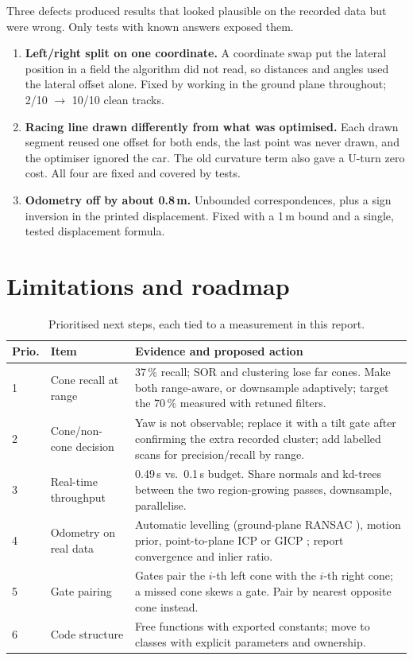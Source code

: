\documentclass[10pt,a4paper]{scrartcl}
\newcommand{\RuleSection}[1]{%
    \section{#1}%
    \vspace{0.2em}{\color{accent!35}\hrule height 0.4pt}\vspace{0.3em}%
  }
\begin{document}
  Three defects produced results that looked plausible on the recorded data but were wrong.
  Only tests with known answers exposed them.
  \begin{enumerate}
    \item \textbf{Left/right split on one coordinate.} A coordinate swap put the lateral position
      in a field the algorithm did not read, so distances and angles used the lateral offset
      alone. Fixed by working in the ground plane throughout; 2/10 $\to$ 10/10 clean tracks.
    \item \textbf{Racing line drawn differently from what was optimised.} Each drawn segment
      reused one offset for both ends, the last point was never drawn, and the optimiser
      ignored the car. The old curvature term also gave a U-turn zero cost. All four are fixed
      and covered by tests.
    \item \textbf{Odometry off by about 0.8\,m.} Unbounded correspondences, plus a sign inversion
      in the printed displacement. Fixed with a 1\,m bound and a single, tested displacement
      formula.
  \end{enumerate}

  \RuleSection{Limitations and roadmap}
  \label{sec:roadmap}

  \begin{table}[htbp]
  \small
  \centering
  \renewcommand{\arraystretch}{1.1}
  \begin{tabularx}{\textwidth}{@{}L{0.8cm} L{5.0cm} X@{}}
  \toprule
  \textbf{Prio.} & \textbf{Item} & \textbf{Evidence and proposed action} \\
   & Cone recall at range & 37\,\% recall; SOR and clustering lose far cones. Make both
      range-aware, or downsample adaptively; target the 70\,\% measured with retuned filters. \\[.15cm]
  2 & Cone/non-cone decision & Yaw is not observable; replace it with a tilt gate after
      confirming the extra recorded cluster; add labelled scans for precision/recall by range. \\[.15cm]
  3 & Real-time throughput & 0.49\,s vs.\ 0.1\,s budget. Share normals and kd-trees between the
      two region-growing passes, downsample, parallelise. \\[.15cm]
  4 & Odometry on real data & Automatic levelling (ground-plane RANSAC \citep{fischler1981ransac}),
      motion prior, point-to-plane ICP or GICP \citep{segal2009gicp}; report convergence and
      inlier ratio. \\[.15cm]
  5 & Gate pairing & Gates pair the $i$-th left cone with the $i$-th right cone; a missed cone
      skews a gate. Pair by nearest opposite cone instead. \\[.15cm]
  6 & Code structure & Free functions with exported constants; move to classes with explicit
      parameters and ownership. \\
  \bottomrule
  \end{tabularx}
  \caption{Prioritised next steps, each tied to a measurement in this report.}
  \label{tab:roadmap}
  \end{table}
\end{document}
